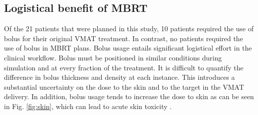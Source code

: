 \documentclass[aapm,graphicx,superscriptaddress]{revtex4-1}
\begin{document}
\subsection{Logistical benefit of MBRT}

Of the 21 patients that were planned in this study, 10 patients required the use of bolus for their original VMAT treatment. In contrast, no patients required the use of bolus in MBRT plans. Bolus usage entails significant logistical effort in the clinical workflow. Bolus must be positioned in similar conditions during simulation and at every fraction of the treatment. It is difficult to quantify the difference in bolus thickness and density at each instance. This introduces a substantial uncertainty on the dose to the skin and to the target in the VMAT delivery. In addition, bolus usage tends to increase the dose to skin as can be seen in Fig. \ref{fig:skin}, which can lead to acute skin toxicity \cite{PIGNOL2015157, PAREKH20188, WONG2020462}. 
\end{document}
